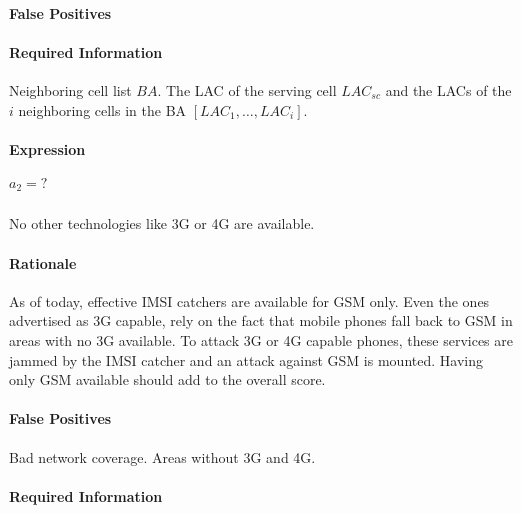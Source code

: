 \documentclass[a4paper,11pt,notitlepage,bigheadings,oneside]{scrartcl}
\begin{document}
\paragraph{False Positives}


\paragraph{Required Information}

Neighboring cell list $BA$. The LAC of the serving cell $LAC_{sc}$ and the LACs
of the $i$ neighboring cells in the BA $[LAC_1,\dots,LAC_i]$.

\paragraph{Expression}

$a_2 = ?$


\subsubsection{}

No other technologies like 3G or 4G are available.

\paragraph{Rationale}

As of today, effective IMSI catchers are available for GSM only. Even the ones
advertised as 3G capable, rely on the fact that mobile phones fall back to GSM
in areas with no 3G available. To attack 3G or 4G capable phones, these
services are jammed by the IMSI catcher and an attack against GSM is mounted.
Having only GSM available should add to the overall score.

\paragraph{False Positives}

Bad network coverage. Areas without 3G and 4G.

\paragraph{Required Information}
\end{document}
